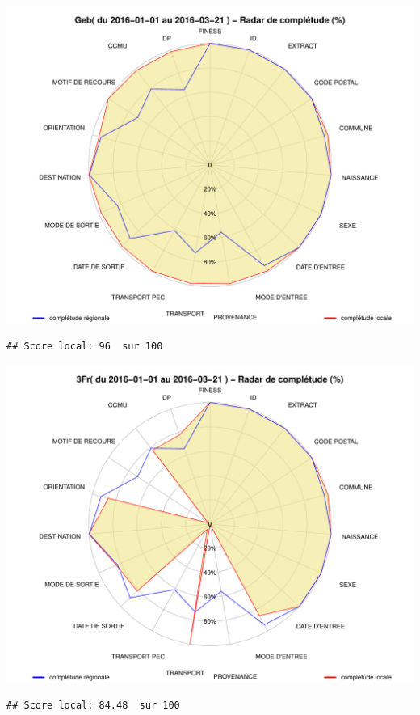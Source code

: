 \documentclass[]{article}
\begin{document}
\includegraphics{completude_files/figure-latex/finess-5.pdf}

\begin{verbatim}
## Score local: 96  sur 100
\end{verbatim}

\includegraphics{completude_files/figure-latex/finess-6.pdf}

\begin{verbatim}
## Score local: 84.48  sur 100
\end{verbatim}
\end{document}
